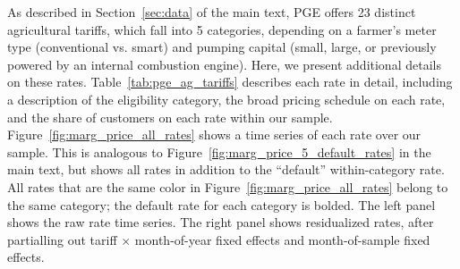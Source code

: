 As described in Section~\ref{sec:data} of the main text, PGE offers 23 distinct agricultural tariffs, which fall into 5 categories, depending on a farmer's meter type (conventional vs. smart) and pumping capital (small, large, or previously powered by an internal combustion engine). Here, we present additional details on these rates. Table~\ref{tab:pge_ag_tariffs} describes each rate in detail, including a description of the eligibility category, the broad pricing schedule on each rate, and the share of customers on each rate within our sample. Figure~\ref{fig:marg_price_all_rates} shows a time series of each rate over our sample. This is analogous to Figure~\ref{fig:marg_price_5_default_rates} in the main text, but shows all rates in addition to the ``default'' within-category rate. All rates that are the same color in Figure~\ref{fig:marg_price_all_rates} belong to the same category; the default rate for each category is bolded. The left panel shows the raw rate time series. The right panel shows residualized rates, after partialling out tariff $\times$ month-of-year fixed effects and month-of-sample fixed effects. 
\\
\\



\FloatBarrier
